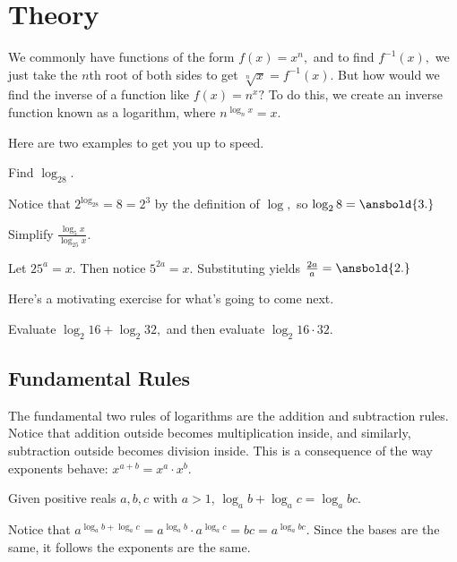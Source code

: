\section{Theory}
We commonly have functions of the form $f(x)=x^n,$ and to find $f^{-1}(x),$ we just take the $n$th root of both sides to get $\sqrt[n]{x}=f^{-1}(x).$ But how would we find the inverse of a function like $f(x)=n^x?$ To do this, we create an inverse function known as a logarithm, where $n^{\log_nx}=x.$

Here are two examples to get you up to speed.

\begin{exam}
Find $\log_28.$
\end{exam}

\begin{sol}
Notice that $2^{\log_28}=8=2^3$ by the definition of $\log,$ so $\log_28=\ansbold{3.}$
\end{sol}

\begin{exam}
Simplify $\frac{\log_5x}{\log_{25}x}.$
\end{exam}

\begin{sol}
Let $25^a=x.$ Then notice $5^{2a}=x.$ Substituting yields $\frac{2a}{a}=\ansbold{2.}$
\end{sol}

Here's a motivating exercise for what's going to come next.

\begin{exer}
Evaluate $\log_2{16}+\log_2{32},$ and then evaluate $\log_2{16\cdot 32}.$
\end{exer}

\subsection{Fundamental Rules}
The fundamental two rules of logarithms are the addition and subtraction rules. Notice that addition outside becomes multiplication inside, and similarly, subtraction outside becomes division inside. This is a consequence of the way exponents behave: $x^{a+b}=x^a\cdot x^b.$

\begin{theo}
Given positive reals $a,b,c$ with $a > 1$, $\log_{a}b+\log_{a}c=\log_{a}{bc}.$
\end{theo}

\begin{pro}
Notice that $a^{\log_ab+\log_ac}=a^{\log_ab}\cdot a^{\log_ac}=bc=a^{\log_abc}.$ Since the bases are the same, it follows the exponents are the same.
\end{pro}

